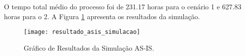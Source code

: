 O tempo total médio do processo foi de 231.17 horas para o cenário 1 e 627.83 horas para o 2. A Figura \ref{fig:resultadosasis} apresenta os resultados da simulação.
\begin{figure}[H]
	\centering
	\texttt{[image: resultado\_asis\_simulacao]}
	\caption[Gráfico de Resultados da Simulação AS-IS]{Gráfico de Resultados da Simulação AS-IS.}
	\label{fig:resultadosasis}
\end{figure}